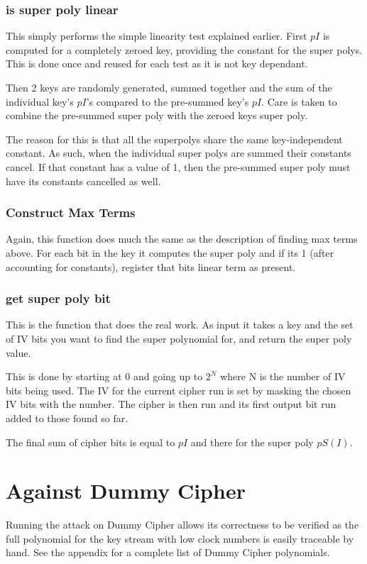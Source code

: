 \documentclass{report}
\let\Oldsection\section
\renewcommand{\section}{\FloatBarrier\Oldsection}
\let\Oldsubsubsection\subsubsection
\renewcommand{\subsubsection}{\FloatBarrier\Oldsubsubsection}
\begin{document}
\subsubsection{is super poly linear}
This simply performs the simple linearity test explained earlier. First $pI$ is computed for a completely zeroed key, providing the constant for the super polys. This is done once and reused for each test as it is not key dependant.

Then 2 keys are randomly generated, summed together and the sum of the individual key's $pI$'s compared to the pre-summed key's $pI$. Care is taken to combine the pre-summed super poly with the zeroed keys super poly.

The reason for this is that all the superpolys share the same key-independent constant. As such, when the individual super polys are summed their constants cancel. If that constant has a value of 1, then the pre-summed super poly must have its constants cancelled as well.

\subsubsection{Construct Max Terms}
Again, this function does much the same as the description of finding max terms above. For each bit in the key it computes the super poly and if its 1 (after accounting for constants), register that bits linear term as present.
\subsubsection{get super poly bit}
This is the function that does the real work. As input it takes a key and the set of IV bits you want to find the super polynomial for, and return the super poly value.

This is done by starting at 0 and going up to $2^N$ where N is the number of IV bits being used. The IV for the current cipher run is set by masking the chosen IV bits with the number. The cipher is then run and its first output bit run added to those found so far.

The final sum of cipher bits is equal to $pI$ and there for the super poly $pS(I)$.
\section{Against Dummy Cipher}
Running the attack on Dummy Cipher allows its correctness to be verified as the full polynomial for the key stream with low clock numbers is easily traceable by hand. See the appendix for a complete list of Dummy Cipher polynomials.
\end{document}
